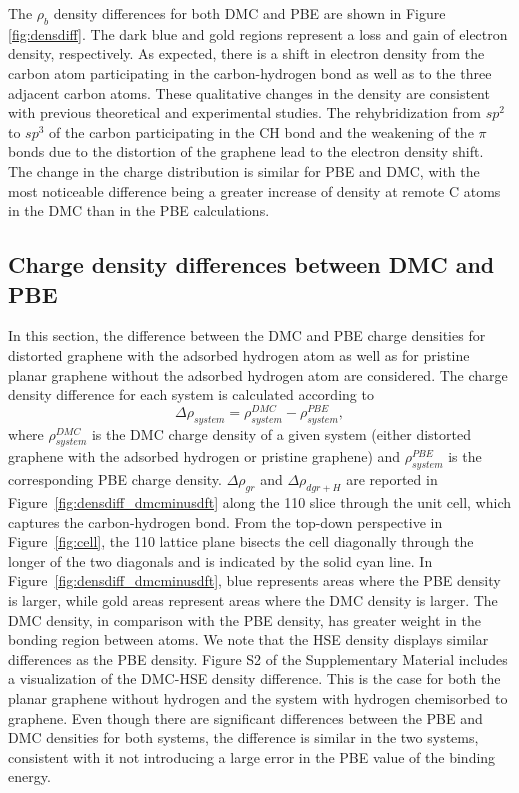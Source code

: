 The $\rho_b$ density differences for both DMC and PBE are shown in Figure \ref{fig:densdiff}. 
The dark blue and gold regions represent a loss and gain of electron density, respectively.
As expected, there is a shift in electron density from the carbon atom participating in the carbon-hydrogen bond as well as to the three adjacent carbon atoms. 
These qualitative changes in the density are consistent with previous theoretical and experimental studies.\cite{10.1063/1.4896611,10.1126/science.aaw6378}
The rehybridization from $sp^2$ to $sp^3$ of the carbon participating in the CH bond and the weakening of the $\pi$ bonds due to the distortion of the graphene lead to the electron density shift.
The change in the charge distribution is similar for PBE and DMC, with the most noticeable difference being a greater increase of density at remote C atoms in the DMC than in the PBE calculations.

\subsection{Charge density differences between DMC and PBE}
In this section, the difference between the DMC and PBE charge densities for distorted graphene with the adsorbed hydrogen atom as well as for pristine planar graphene without the adsorbed hydrogen atom are considered. 
The charge density difference for each system is calculated according to 
\begin{equation}
    \Delta\rho_{system} =\rho_{system}^{DMC}- \rho_{system}^{PBE},
    \label{eq:densdiff}
\end{equation}
where $\rho_{system}^{DMC}$ is the DMC charge density of a given system (either distorted graphene with the adsorbed hydrogen or pristine graphene) and $\rho_{system}^{PBE}$ is the corresponding PBE charge density.
$\Delta\rho_{gr}$ and $\Delta\rho_{dgr+H}$ are reported in Figure~\ref{fig:densdiff_dmcminusdft} along the 110 slice through the unit cell, which captures the carbon-hydrogen bond.
From the top-down perspective in Figure~\ref{fig:cell}, the 110 lattice plane bisects the cell diagonally through the longer of the two diagonals and is indicated by the solid cyan line.
In Figure~\ref{fig:densdiff_dmcminusdft}, blue represents areas where the PBE density is larger, while gold areas represent areas where the DMC density is larger.
The DMC density, in comparison with the PBE density, has greater weight in the bonding region between atoms.
We note that the HSE density displays similar differences as the PBE density. Figure S2 of the Supplementary Material includes a visualization of the DMC-HSE density difference.
This is the case for both the planar graphene without hydrogen and the system with hydrogen chemisorbed to graphene.
Even though there are significant differences between the PBE and DMC densities for both systems, the difference is similar in the two systems, consistent with it not introducing a large error in the PBE value of the binding energy.


